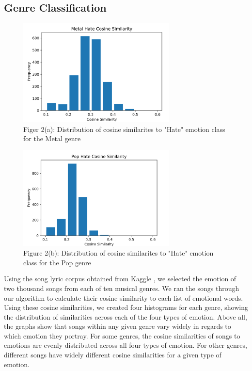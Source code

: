 \documentclass[10pt,twocolumn]{article}
\begin{document}
\subsection{Genre Classification}
\begin{figure}[!hb]
\centering
\includegraphics[width=3.125in]{metal_hate.png}
\caption{Figer 2(a): Distribution of cosine similarites to "Hate" emotion class for the Metal genre}
\label{fig:digraph}
\end{figure}
\begin{figure}[!hb]
\centering
\includegraphics[width=3.125in]{pop_hate.png}
\caption{Figure 2(b): Distribution of cosine similarites to "Hate" emotion class for the Pop genre}
\label{fig:digraph}
\end{figure}
Using the song lyric corpus obtained from Kaggle \cite{a14}, we selected the emotion of two thousand songs from each of ten musical genres. We ran the songs through our algorithm to calculate their cosine similarity to each list of emotional words. Using these cosine similarities, we created four histograms for each genre, showing the distribution of similarities across each of the four types of emotion. Above all, the graphs show that songs within any given genre vary widely in regards to which emotion they portray. For some genres, the cosine similarities of songs to emotions are evenly distributed across all four types of emotion.  For other genres, different songs have widely different cosine similarities for a given type of emotion.
\end{document}
